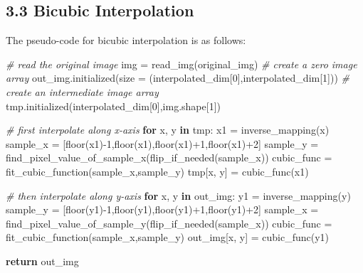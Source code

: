 \documentclass[
]{article}
\newenvironment{Shaded}{}{}
\newcommand{\CommentTok}[1]{\textcolor[rgb]{0.38,0.63,0.69}{\textit{#1}}}
\newcommand{\ControlFlowTok}[1]{\textcolor[rgb]{0.00,0.44,0.13}{\textbf{#1}}}
\newcommand{\DecValTok}[1]{\textcolor[rgb]{0.25,0.63,0.44}{#1}}
\newcommand{\KeywordTok}[1]{\textcolor[rgb]{0.00,0.44,0.13}{\textbf{#1}}}
\newcommand{\NormalTok}[1]{#1}
\newcommand{\OperatorTok}[1]{\textcolor[rgb]{0.40,0.40,0.40}{#1}}
\begin{document}
\hypertarget{33-bicubic-interpolation}{%
\subsection{3.3 Bicubic Interpolation}\label{33-bicubic-interpolation}}

The pseudo-code for bicubic interpolation is as follows:

\begin{Shaded}
\begin{Highlighting}[]
\CommentTok{\# read the original image}
\NormalTok{img }\OperatorTok{=}\NormalTok{ read\_img(original\_img)}
\CommentTok{\# create a zero image array}
\NormalTok{out\_img.initialized(size }\OperatorTok{=}\NormalTok{ (interpolated\_dim[}\DecValTok{0}\NormalTok{],interpolated\_dim[}\DecValTok{1}\NormalTok{]))}
\CommentTok{\# create an intermediate image array}
\NormalTok{tmp.initialized(interpolated\_dim[}\DecValTok{0}\NormalTok{],img.shape[}\DecValTok{1}\NormalTok{])}

\CommentTok{\# first interpolate along x{-}axis}
\ControlFlowTok{for}\NormalTok{ x, y }\KeywordTok{in}\NormalTok{ tmp:}
\NormalTok{    x1 }\OperatorTok{=}\NormalTok{ inverse\_mapping(x)}
\NormalTok{    sample\_x }\OperatorTok{=}\NormalTok{ [floor(x1)}\OperatorTok{{-}}\DecValTok{1}\NormalTok{,floor(x1),floor(x1)}\OperatorTok{+}\DecValTok{1}\NormalTok{,floor(x1)}\OperatorTok{+}\DecValTok{2}\NormalTok{]}
\NormalTok{    sample\_y }\OperatorTok{=}\NormalTok{ find\_pixel\_value\_of\_sample\_x(flip\_if\_needed(sample\_x))}
\NormalTok{    cubic\_func }\OperatorTok{=}\NormalTok{ fit\_cubic\_function(sample\_x,sample\_y)}
\NormalTok{    tmp[x, y] }\OperatorTok{=}\NormalTok{ cubic\_func(x1)}

\CommentTok{\# then interpolate along y{-}axis}
\ControlFlowTok{for}\NormalTok{ x, y }\KeywordTok{in}\NormalTok{ out\_img:}
\NormalTok{    y1 }\OperatorTok{=}\NormalTok{ inverse\_mapping(y)}
\NormalTok{    sample\_y }\OperatorTok{=}\NormalTok{ [floor(y1)}\OperatorTok{{-}}\DecValTok{1}\NormalTok{,floor(y1),floor(y1)}\OperatorTok{+}\DecValTok{1}\NormalTok{,floor(y1)}\OperatorTok{+}\DecValTok{2}\NormalTok{]}
\NormalTok{    sample\_x }\OperatorTok{=}\NormalTok{ find\_pixel\_value\_of\_sample\_y(flip\_if\_needed(sample\_x))}
\NormalTok{    cubic\_func }\OperatorTok{=}\NormalTok{ fit\_cubic\_function(sample\_x,sample\_y)}
\NormalTok{    out\_img[x, y] }\OperatorTok{=}\NormalTok{ cubic\_func(y1)}

\ControlFlowTok{return}\NormalTok{ out\_img}
\end{Highlighting}
\end{Shaded}
\end{document}

